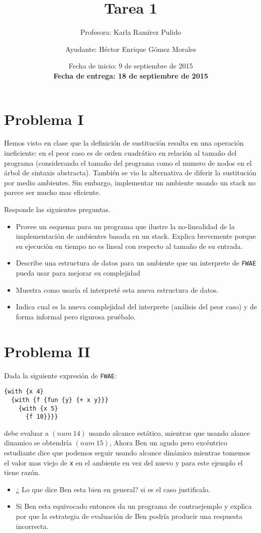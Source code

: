 \documentclass{article}
\author{Profesora: Karla Ramírez Pulido \and
  Ayudante: Héctor Enrique Gómez Morales}
\title{Tarea 1}
\date{Fecha de inicio: 9 de septiembre de 2015\\
  \textbf{Fecha de entrega: 18 de septiembre de 2015}}
\begin{document}
\maketitle
\section{Problema I}

Hemos visto en clase que la definición de sustitución resulta en una operación ineficiente: en el peor caso es de orden cuadrático en relación al tamaño del programa (considerando el tamaño del programa como el numero de nodos en el árbol de sintaxis abstracta). También se vio la alternativa de diferir la sustitución por medio ambientes. Sin embargo, implementar un ambiente usando un stack no parece ser mucho mas eficiente.

Responde las siguientes preguntas.
\begin{itemize}
\item Provee un esquema para un programa que ilustre la no-linealidad de la implementación de ambientes basada en un stack. Explica brevemente porque su ejecución en tiempo no es lineal con respecto al tamaño de su entrada.
\item Describe una estructura de datos para un ambiente que un interprete de \texttt{FWAE} pueda usar para mejorar su complejidad
\item Muestra como usaría el interpreté esta nueva estructura de datos.
\item Indica cual es la nueva complejidad del interprete (análisis del peor caso) y de forma informal pero rigurosa pruébalo.
\end{itemize}

\section{Problema II}
Dada la siguiente expresión de \texttt{FWAE}:
\begin{verbatim}
{with {x 4}
  {with {f {fun {y} {+ x y}}}
    {with {x 5}
      {f 10}}}}
\end{verbatim}
debe evaluar a $(num\ 14)$ usando alcance estático, mientras que usando alance dinamico se obtendría $(num\ 15)$, Ahora Ben un agudo pero excéntrico estudiante dice que podemos seguir usando alcance dinámico mientras tomemos el valor mas viejo de \verb;x; en el ambiente en vez del nuevo y para este ejemplo el tiene razón.
\begin{itemize}
\item{¿ Lo que dice Ben esta bien en general? si es el caso justificalo. }
\item{Si Ben esta equivocado entonces da un programa de contraejemplo y explica
por que la estrategia de evaluación de Ben podría producir una respuesta incorrecta.}
\end{itemize}
\end{document}
